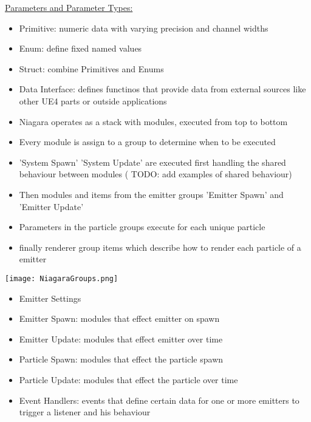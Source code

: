 \smallskip
            \underline{Parameters and Parameter Types:}
            \begin{itemize}
                \item Primitive: numeric data with varying precision and channel widths
                \item Enum: define fixed named values
                \item Struct: combine Primitives and Enums
                \item Data Interface: defines functinos that provide data from external sources like other UE4 parts or outside applications
            \end{itemize}
\smallskip
            \begin{itemize}
                \item Niagara operates as a stack with modules, executed from top to bottom
                \item Every module is assign to a group to determine when to be executed
                \item 'System Spawn' 'System Update' are executed first handling the shared behaviour between modules ( TODO: add examples of shared behaviour)
                \item Then modules and items from the emitter groups 'Emitter Spawn' and 'Emitter Update'
                \item Parameters in the particle groups execute for each unique particle
                \item finally renderer group items which describe how to render each particle of a emitter
            \end{itemize}                      
\smallskip
            \texttt{[image: NiagaraGroups.png]} \\
            \begin{itemize}
                \item Emitter Settings
                \item Emitter Spawn: modules that effect emitter on spawn
                \item Emitter Update: modules that effect emitter over time
                \item Particle Spawn: modules that effect the particle spawn
                \item Particle Update: modules that effect the particle over time
                \item Event Handlers: events that define certain data for one or more emitters to trigger a listener and his behaviour
            \end{itemize}

